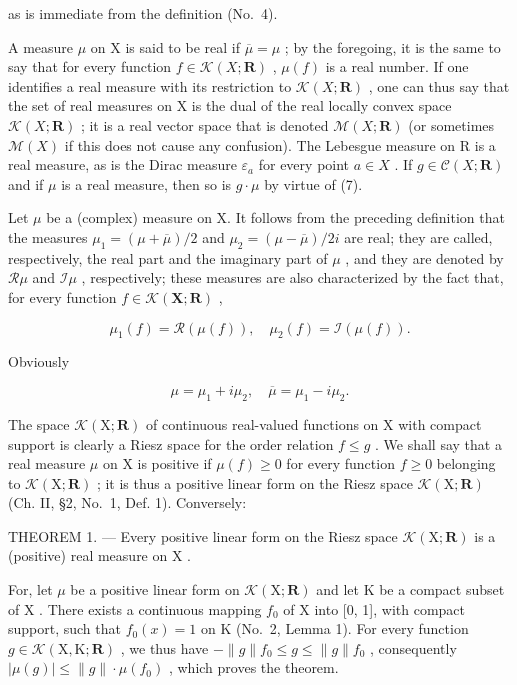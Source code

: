 as is immediate from the definition (No.~4).

A measure \(\mu\) on X is said to be real if \(\overline{\mu} = \mu\) ; by the foregoing, it is the same to say that for every function \(f \in \mathcal{K}(X; \mathbf{R})\) , \(\mu(f)\) is a real number. If one identifies a real measure with its restriction to \(\mathcal{K}(X; \mathbf{R})\) , one can thus say that the set of real measures on X is the dual of the real locally convex space \(\mathcal{K}(X; \mathbf{R})\) ; it is a real vector space that is denoted \(\mathcal{M}(X; \mathbf{R})\) (or sometimes \(\mathcal{M}(X)\) if this does not cause any confusion). The Lebesgue measure on R is a real measure, as is the Dirac measure \(\varepsilon_{a}\) for every point \(a \in X\) . If \(g \in \mathcal{C}(X; \mathbf{R})\) and if \(\mu\) is a real measure, then so is \(g \cdot \mu\) by virtue of (7).

Let \(\mu\) be a (complex) measure on X. It follows from the preceding definition that the measures \(\mu_{1} = (\mu +\overline{\mu}) / 2\) and \(\mu_{2} = (\mu -\overline{\mu}) / 2i\) are real; they are called, respectively, the real part and the imaginary part of \(\mu\) , and they are denoted by \(\mathcal{R}\mu\) and \(\mathcal{I}\mu\) , respectively; these measures are also characterized by the fact that, for every function \(f\in \mathcal{K}(\mathbf{X};\mathbf{R})\) ,

\[
\mu_ {1} (f) = \mathcal {R} (\mu (f)), \quad \mu_ {2} (f) = \mathcal {I} (\mu (f)).
\]

Obviously

\[
\mu = \mu_ {1} + i \mu_ {2}, \quad \overline {{{{\mu}}}} = \mu_ {1} - i \mu_ {2}.
\]

The space \(\mathcal{K}(\mathrm{X};\mathbf{R})\) of continuous real-valued functions on \(\mathrm{X}\) with compact support is clearly a Riesz space for the order relation \(f\leqslant g\) . We shall say that a real measure \(\mu\) on \(\mathrm{X}\) is positive if \(\mu (f)\geqslant 0\) for every function \(f\geqslant 0\) belonging to \(\mathcal{K}(\mathrm{X};\mathbf{R})\) ; it is thus a positive linear form on the Riesz space \(\mathcal{K}(\mathrm{X};\mathbf{R})\) (Ch. II, §2, No.~1, Def. 1). Conversely:

THEOREM 1. --- Every positive linear form on the Riesz space \(\mathcal{K}(\mathrm{X};\mathbf{R})\) is a (positive) real measure on \(\mathrm{X}\) .

For, let \(\mu\) be a positive linear form on \(\mathcal{K}(\mathrm{X};\mathbf{R})\) and let \(\mathrm{K}\) be a compact subset of \(\mathrm{X}\) . There exists a continuous mapping \(f_0\) of \(\mathrm{X}\) into {[}0, 1{]}, with compact support, such that \(f_0(x) = 1\) on \(\mathrm{K}\) (No.~2, Lemma 1). For every function \(g \in \mathcal{K}(\mathrm{X},\mathrm{K};\mathbf{R})\) , we thus have \(-\| g \| f_0 \leqslant g \leqslant \| g \| f_0\) , consequently \(|\mu(g)| \leqslant \| g \| \cdot \mu(f_0)\) , which proves the theorem.

